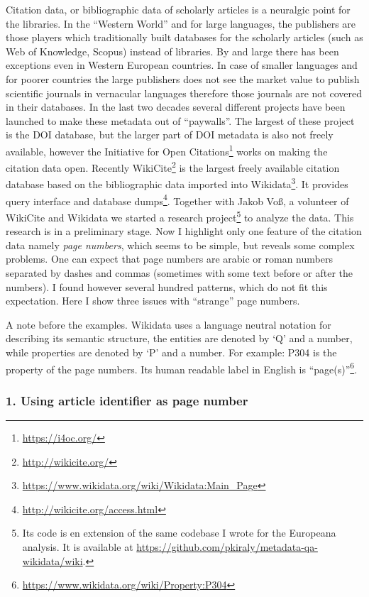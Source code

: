 Citation data, or bibliographic data of scholarly articles is a neuralgic point for the libraries. In the ``Western World'' and for large languages, the publishers are those players which traditionally built databases for the scholarly articles (such as Web of Knowledge, Scopus) instead of libraries. By and large there has been exceptions even in Western European countries. In case of smaller languages and for poorer countries the large publishers does not see the market value to publish scientific journals in vernacular languages therefore those journals are not covered in their databases. In the last two decades several different projects have been launched to make these metadata out of ``paywalls''. The largest of these project is the DOI database, but the larger part of DOI metadata is also not freely available, however the Initiative for Open Citations\footnote{\url{https://i4oc.org/}} works on making the citation data open. Recently WikiCite\footnote{\url{http://wikicite.org/}} is the largest freely available citation database based on the bibliographic data imported into Wikidata\footnote{\url{https://www.wikidata.org/wiki/Wikidata:Main_Page}}. It provides query interface and database dumps\footnote{\url{http://wikicite.org/access.html}}. Together with Jakob Voß, a volunteer of WikiCite and Wikidata we started a research project\footnote{Its code is en extension of the same codebase I wrote for the Europeana analysis. It is available at \url{https://github.com/pkiraly/metadata-qa-wikidata/wiki}.} to analyze the data. This research is in a preliminary stage. Now I highlight only one feature of the citation data namely \emph{page numbers}, which seems to be simple, but reveals some complex problems. One can expect that page numbers are arabic or roman numbers separated by dashes and commas (sometimes with some text before or after the numbers). I found however several hundred patterns, which do not fit this expectation. Here I show three issues with ``strange'' page numbers.

A note before the examples. Wikidata uses a language neutral notation for describing its semantic structure, the entities are denoted by `Q' and a number, while properties are denoted by `P' and a number. For example: P304 is the property of the page numbers. Its human readable label in English is ``page(s)''\footnote{\url{https://www.wikidata.org/wiki/Property:P304}}.

\subsubsection{1. Using article identifier as page number}

